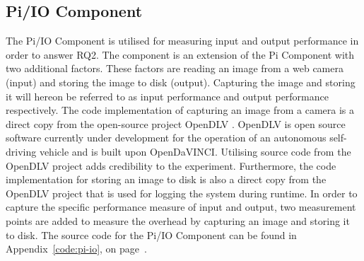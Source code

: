 


\subsection{Pi/IO Component}
The Pi/IO Component is utilised for measuring input and output performance in order to answer RQ2. The component is an extension of the Pi Component with two additional factors. These factors are reading an image from a web camera (input) and storing the image to disk (output). Capturing the image and storing it will hereon be referred to as input performance  and output performance respectively. The code implementation of capturing an image from a camera is a direct copy from the open-source project OpenDLV \cite{opendlv}. OpenDLV is open source software currently under development for the operation of an autonomous self-driving vehicle and is built upon OpenDaVINCI. Utilising source code from the OpenDLV project adds credibility to the experiment. Furthermore, the code implementation for storing an image to disk is also a direct copy from the OpenDLV project that is used for logging the system during runtime. In order to capture the specific performance measure of input and output, two measurement points are added to measure the overhead by capturing an image and storing it to disk. The source code for the Pi/IO Component can be found in Appendix~\ref{code:pi-io}, on page~\pageref{code:pi-io}.

